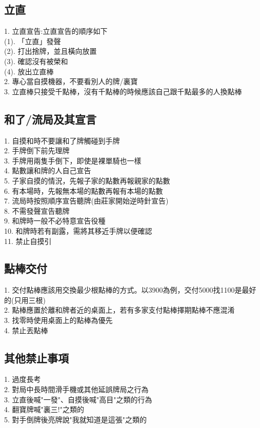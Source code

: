 \documentclass[a4paper,12pt]{article}
\begin{document}
\subsection{立直}
1. 立直宣告:立直宣告的順序如下 \\
    (1). 「立直」發聲 \\
    (2). 打出捨牌，並且橫向放置 \\
    (3). 確認沒有被榮和 \\
    (4). 放出立直棒 \\
2. 專心當自摸機器，不要看別人的牌/裏寶 \\
3. 立直棒只接受千點棒，沒有千點棒的時候應該自己跟千點最多的人換點棒 \\
\subsection{和了/流局及其宣言}
1. 自摸和時不要讓和了牌觸碰到手牌 \\
2. 手牌倒下前先理牌 \\
3. 手牌用兩隻手倒下，即使是裸單騎也一樣 \\
4. 點數讓和牌的人自己宣告 \\
5. 子家自摸的情況，先報子家的點數再報親家的點數 \\
6. 有本場時，先報無本場的點數再報有本場的點數 \\
7. 流局時按照順序宣告聽牌(由莊家開始逆時針宣告) \\
8. 不需發聲宣告聽牌 \\
9. 和牌時一般不必特意宣告役種 \\
10. 和牌時若有副露，需將其移近手牌以便確認 \\
11. 禁止自摸引 \\
\subsection{點棒交付}
1. 交付點棒應該用交換最少根點棒的方式。以3900為例，交付5000找1100是最好的(只用三根) \\
2. 點棒應置於離和牌者近的桌面上，若有多家支付點棒擇期點棒不應混淆 \\
3. 找零時使用桌面上的點棒為優先 \\
4. 禁止丟點棒 \\
\subsection{其他禁止事項}
1. 過度長考 \\
2. 對局中長時間滑手機或其他延誤牌局之行為 \\
3. 立直後喊"一發"、自摸後喊"高目"之類的行為 \\
4. 翻寶牌喊"裏三!"之類的 \\
5. 對手倒牌後亮牌說"我就知道是這張"之類的 \\
\end{document}

